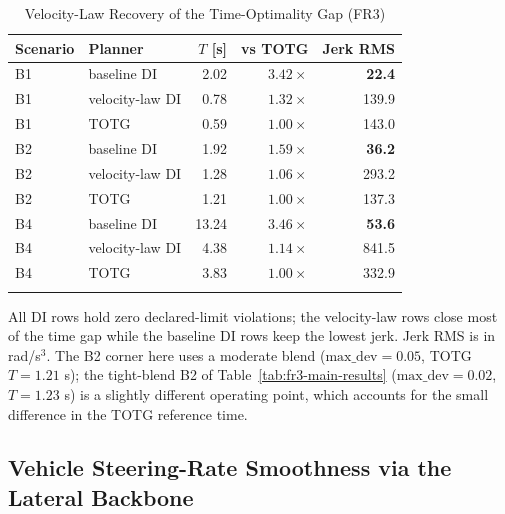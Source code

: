 {%
\begin{table}[t]
\caption{Velocity-Law Recovery of the Time-Optimality Gap (FR3)}
\label{tab:velocity-law}
\centering
\footnotesize
\setlength{\tabcolsep}{4pt}
\begin{tabular}{@{}llrrr@{}}
\toprule\noalign{}
Scenario & Planner & \(T\) {[}s{]} & vs TOTG & Jerk RMS \\
\midrule\noalign{}
B1 & baseline DI    & 2.02 & \(3.42\times\) & \textbf{22.4} \\
B1 & velocity-law DI & 0.78 & \textbf{\(1.32\times\)} & 139.9 \\
B1 & TOTG            & 0.59 & \(1.00\times\) & 143.0 \\
\midrule
B2 & baseline DI    & 1.92 & \(1.59\times\) & \textbf{36.2} \\
B2 & velocity-law DI & 1.28 & \textbf{\(1.06\times\)} & 293.2 \\
B2 & TOTG            & 1.21 & \(1.00\times\) & 137.3 \\
\midrule
B4 & baseline DI    & 13.24 & \(3.46\times\) & \textbf{53.6} \\
B4 & velocity-law DI & 4.38 & \textbf{\(1.14\times\)} & 841.5 \\
B4 & TOTG            & 3.83 & \(1.00\times\) & 332.9 \\
\bottomrule\noalign{}
\end{tabular}
\end{table}
}
All DI rows hold zero declared-limit violations; the velocity-law rows
close most of the time gap while the baseline DI rows keep the lowest
jerk. Jerk RMS is in rad/s\(^3\). The B2 corner here uses a moderate blend
(\(\text{max\_dev}=0.05\), TOTG \(T=1.21\) s); the tight-blend B2 of
Table~\ref{tab:fr3-main-results} (\(\text{max\_dev}=0.02\), \(T=1.23\) s) is
a slightly different operating point, which accounts for the small
difference in the TOTG reference time.

\subsection{Vehicle Steering-Rate Smoothness via the Lateral
Backbone}\label{c.-autonomous-vehicle-motion-planning-with-the-double-integrator-backbone}

